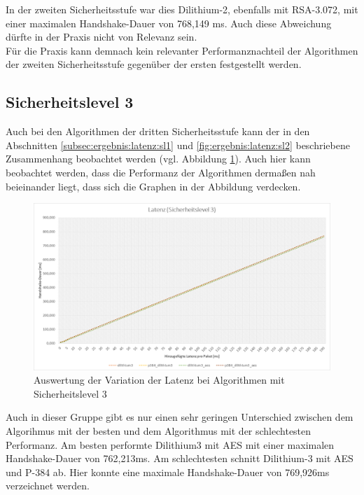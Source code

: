 		In der zweiten Sicherheitsstufe war dies Dilithium-2, ebenfalls mit RSA-3.072, mit einer maximalen 				Handshake-Dauer von 768,149 ms. Auch diese Abweichung dürfte in der Praxis nicht von Relevanz sein.\\
		
		Für die Praxis kann demnach kein relevanter Performanznachteil der Algorithmen der zweiten 						Sicherheitsstufe gegenüber der ersten festgestellt werden.
		
		\subsection{Sicherheitslevel 3}
		\label{subsec:ergebnis:latenz:sl3}
		
		Auch bei den Algorithmen der dritten Sicherheitsstufe kann der in den Abschnitten 									\ref{subsec:ergebnis:latenz:sl1} und \ref{fig:ergebnis:latenz:sl2} beschriebene Zusammenhang beobachtet 		werden (vgl. Abbildung \ref{fig:ergebnis:latenz:sl3}). Auch hier kann beobachtet werden, dass die 					Performanz der Algorithmen dermaßen nah beieinander liegt, dass sich die Graphen in der Abbildung 					verdecken.
		
		\begin{figure}[htbp]
			\centering
			\includegraphics[width=\textwidth]{../auswertung/latenz_sl3.png}
			\caption{Auswertung der Variation der Latenz bei Algorithmen mit Sicherheitslevel 3}
			\label{fig:ergebnis:latenz:sl3}
		\end{figure}
		
		Auch in dieser Gruppe gibt es nur einen sehr geringen Unterschied zwischen dem Algorihmus mit der 					besten und dem Algorithmus mit der schlechtesten Performanz. Am besten performte Dilithium3 mit AES mit 		einer maximalen Handshake-Dauer von 762,213ms. Am schlechtesten schnitt Dilithium-3 mit AES und P-384 				ab. Hier konnte eine maximale Handshake-Dauer von 769,926ms verzeichnet werden.\\
		
